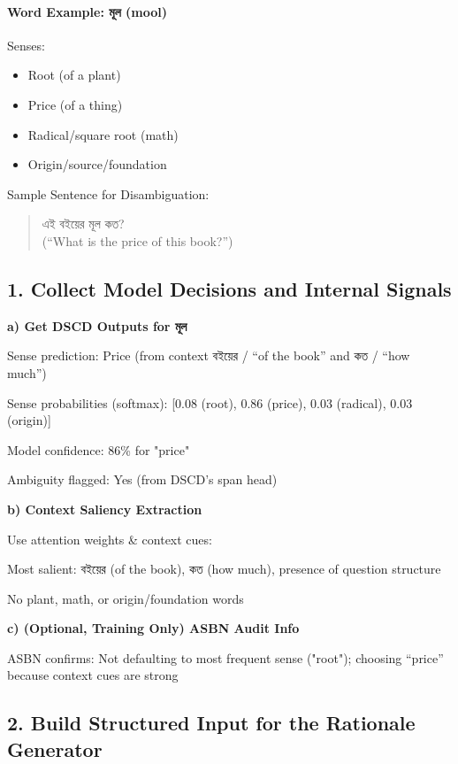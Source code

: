 \documentclass[a4paper,12pt]{article}
\begin{document}
\paragraph{Word Example: \textbengali{মূল} (mool)}

Senses:
\begin{itemize}
    \item Root (of a plant)
    \item Price (of a thing)
    \item Radical/square root (math)
    \item Origin/source/foundation
\end{itemize}

Sample Sentence for Disambiguation:

\begin{quote}
\textbengali{এই বইয়ের মূল কত?}\\
(“What is the price of this book?”)
\end{quote}

\subsection*{1. Collect Model Decisions and Internal Signals}

\textbf{a) Get DSCD Outputs for \textbengali{মূল}}

Sense prediction: Price (from context \textbengali{বইয়ের} / “of the book” and \textbengali{কত} / “how much”)

Sense probabilities (softmax): [0.08 (root), 0.86 (price), 0.03 (radical), 0.03 (origin)]

Model confidence: 86\% for "price"

Ambiguity flagged: Yes (from DSCD’s span head)

\textbf{b) Context Saliency Extraction}

Use attention weights \& context cues:

Most salient: \textbengali{বইয়ের} (of the book), \textbengali{কত} (how much), presence of question structure

No plant, math, or origin/foundation words

\textbf{c) (Optional, Training Only) ASBN Audit Info}

ASBN confirms: Not defaulting to most frequent sense ("root"); choosing “price” because context cues are strong

\subsection*{2. Build Structured Input for the Rationale Generator}
\end{document}

